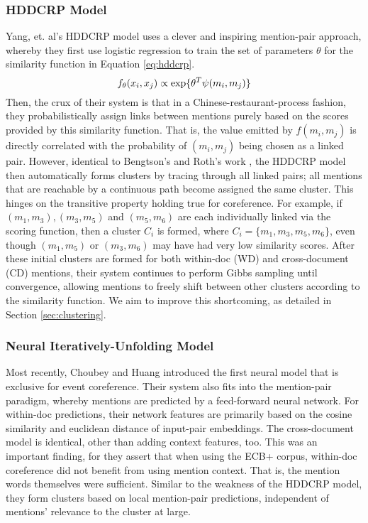 \documentclass[11pt,a4paper]{article}
\begin{document}
\subsubsection{HDDCRP Model}
\label{sec:HDDCRP}
Yang, et. al's HDDCRP model  uses a clever and inspiring mention-pair approach, whereby they first use logistic regression to train the set of parameters $\theta$ for the similarity function in Equation \ref{eq:hddcrp}.  
\begin{equation}
\label{eq:hddcrp}
f_{\theta}(x_i,x_j) \propto \textnormal{exp\{} \theta^T\psi(m_i,m_j)\textnormal{\}}
\end{equation}
Then, the crux of their system is that in a Chinese-restaurant-process fashion, they probabilistically assign links between mentions purely based on the scores provided by this similarity function.  That is, the value emitted by $f(m_i,m_j)$ is directly correlated with the probability of $(m_i,m_j)$ being chosen as a linked pair.  However, identical to Bengtson's and Roth's work \cite{Bengtson:2008:UVF:1613715.1613756}, the HDDCRP model then automatically forms clusters by tracing through all linked pairs; all mentions that are reachable by a continuous path become assigned the same cluster.  This hinges on the transitive property holding true for coreference.  For example, if ${(m_1,m_3),(m_3,m_5)}$ and $(m_5,m_6)$ are each individually linked via the scoring function, then a cluster $C_i$ is formed, where $C_i = \{m_1,m_3,m_5,m_6\}$, even though $(m_1,m_5)$ or $(m_3,m_6)$ may have had very low similarity scores.  After these initial clusters are formed for both within-doc (WD) and cross-document (CD) mentions, their system continues to perform Gibbs sampling until convergence, allowing mentions to freely shift between other clusters according to the similarity function.  We aim to improve this shortcoming, as detailed in Section \ref{sec:clustering}.

\subsubsection{Neural Iteratively-Unfolding Model}
\label{sec:Choubey}
Most recently, Choubey and Huang  introduced the first neural model that is exclusive for event coreference.  Their system also fits into the mention-pair paradigm, whereby mentions are predicted by a feed-forward neural network. For within-doc predictions, their network features are primarily based on the cosine similarity and euclidean distance of input-pair embeddings.  The cross-document model is identical, other than adding context features, too.  This was an important finding, for they assert that when using the ECB+ corpus, within-doc coreference did not benefit from using mention context.  That is, the mention words themselves were sufficient.  Similar to the weakness of the HDDCRP model, they form clusters based on local mention-pair predictions, independent of mentions' relevance to the cluster at large.
\end{document}
